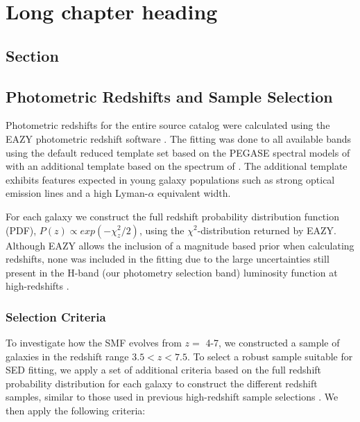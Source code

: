 
\chapter[Sample Selection]{Long chapter heading} 
\label{ch:chapter2_label}

\section[Sec]{Section}
\label{sec:section2_label}
\section{Photometric Redshifts and Sample Selection}\label{sec:redshift}
Photometric redshifts for the entire source catalog were calculated using the EAZY photometric redshift software \citep{Anonymous:QJyxUpMF}. The fitting was done to all available bands using the default reduced template set based on the PEGASE spectral models of \citet{1997A&A...326..950F} with an additional template based on the spectrum of \citet{2010ApJ...719.1168E}. The additional template exhibits features expected in young galaxy populations such as strong optical emission lines and a high Lyman-$\alpha$ equivalent width.

For each galaxy we construct the full redshift probability distribution function (PDF), $P(z) \propto exp(-\chi_{z}^2/2)$, using the $\chi^2$-distribution returned by EAZY. 
Although EAZY allows the inclusion of a magnitude based prior when calculating redshifts, none was included in the fitting due to the large uncertainties still present in the H-band (our photometry selection band) luminosity function at high-redshifts \citep{Henriques:2012gs}.

\subsection{Selection Criteria} \label{sec:sample}
To investigate how the SMF evolves from $z =$ 4-7, we constructed a sample of galaxies in the redshift range $3.5 < z < 7.5$. To select a robust sample suitable for SED fitting, we apply a set of additional criteria based on the full redshift probability distribution for each galaxy to construct the different redshift samples, similar to those used in previous high-redshift sample selections \citep{2011MNRAS.418.2074M,Finkelstein:2012hr}. We then apply the following criteria:

